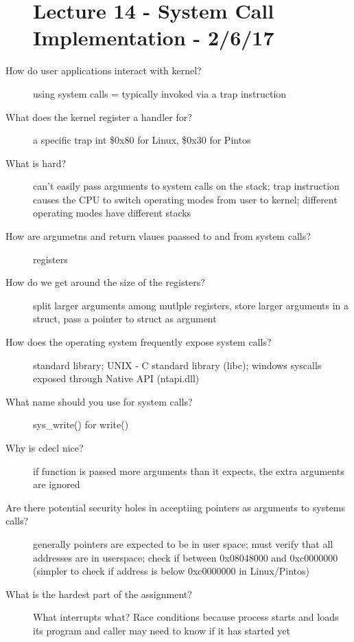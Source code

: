 \documentclass[10pt]{article}
\begin{document}
\begin{description}
\section{Lecture 14 - System Call Implementation - 2/6/17}
\item[How do user applications interact with kernel?]
  using system calls = typically invoked via a trap instruction
\item[What does the kernel register a handler for?]
  a specific trap int \$0x80 for Linux, \$0x30 for Pintos
\item[What is hard?]
  can't easily pass arguments to system calls on the stack;
  trap instruction causes the CPU to switch operating modes from user to kernel;
  different operating modes have different stacks
\item[How are argumetns and return vlaues paassed to and from system calls?]
  registers
\item[How do we get around the size of the registers?]
  split larger arguments among mutlple registers, store larger arguments in a struct, pass a pointer to struct as argument
\item[How does the operating system frequently expose system calls?]
  standard library;
  UNIX - C standard library (libc);
  windows syscalls exposed through Native API (ntapi.dll)
\item[What name should you use for system calls?]
  sys\_write() for write()
\item[Why is cdecl nice?]
  if function is passed more arguments than it expects, the extra arguments are ignored
\item[Are there potential security holes in acceptiing pointers as arguments to systems calls?]
  generally pointers are expected to be in user space;
  must verify that all addresses are in userspace;
  check if between 0x08048000 and 0xc0000000 (simpler to check if address is below 0xc0000000 in Linux/Pintos)
\item[What is the hardest part of the assignment?]
  What interrupts what?
  Race conditions because process starts and loads its program and caller may need to know if it has started yet
\end{description}
\end{document}
